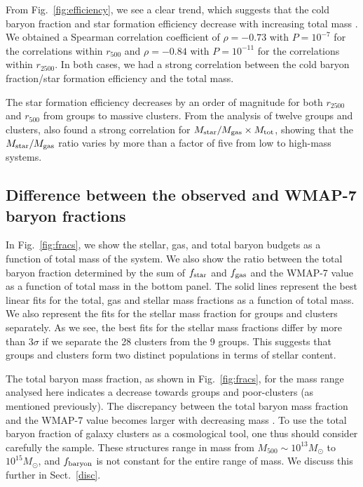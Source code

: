 \documentclass{aa}
\begin{document}
From Fig.~\ref{fig:efficiency}, we see a clear trend, which suggests
  that the cold baryon fraction and star formation efficiency decrease
  with increasing total mass \citep[as reported previously
  by][]{david90,roussel00}.  We obtained a Spearman correlation
  coefficient of $\rho=-0.73$ with $P=10^{-7}$ for the correlations
  within $r_{500}$ and $\rho=-0.84$ with $P=10^{-11}$ for the
  correlations within $r_{2500}$. In both cases, we had a strong
  correlation between the cold baryon fraction/star formation
  efficiency and the total mass.


The star formation efficiency decreases by an order of
  magnitude for both $r_{2500}$ and $r_{500}$ from groups to massive
  clusters. From the analysis of twelve groups and clusters,
  \citet{david90} also found a strong correlation for $M_{\rm
    star}/M_{\rm gas} \times  M_{\rm tot}$, showing that the $M_{\rm
    star}/M_{\rm gas}$  ratio varies by more than a factor of
  five from low to high-mass systems.  



\subsection{Difference between the observed and WMAP-7 baryon
  fractions}
\label{contr_icl}


In Fig.~\ref{fig:fracs}, we show the stellar, gas, and total
  baryon budgets as a function of total mass of the system.  We also
  show the ratio between the total baryon
  fraction determined by the sum of $f_{\rm star}$ and $f_{\rm gas}$
  and the WMAP-7 value as a function of total mass in the bottom panel.  The solid lines
  represent the best linear fits for the total, gas and stellar mass fractions as a function of total
  mass. We also represent the fits for the stellar
  mass fraction  for groups and clusters separately. As we see, the best fits for the
  stellar mass fractions differ by more than $3\sigma$ if we
  separate the 28 clusters from the 9 groups. This suggests
  that groups and clusters form two distinct populations in terms of
  stellar content.

  The total baryon mass fraction, as shown in Fig.~\ref{fig:fracs}, for the
  mass range analysed here indicates a decrease towards groups and
  poor-clusters (as mentioned previously).  The discrepancy between
  the total baryon mass fraction and the WMAP-7 value becomes larger
  with decreasing mass \citep[as already pointed out by some previous
  works, such as in][]{gonzales07,giodini09,andreon10}.  To use the total
  baryon fraction of galaxy clusters as a cosmological tool, one thus should
  consider carefully the sample. These structures range in
  mass from $M_{500} \sim 10^{13} M_{\odot}$ to $10^{15} M_{\odot}$,
  and $f_{\rm baryon}$ is not constant for the entire range of mass.
We discuss this further  in Sect.~\ref{disc}.
\end{document}
